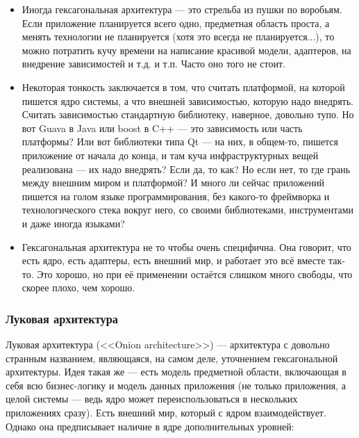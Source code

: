 \documentclass[a5paper]{article}
\begin{document}
\begin{itemize}
    \item Иногда гексагональная архитектура --- это стрельба из пушки по воробьям. Если приложение планируется всего одно, предметная область проста, а менять технологии не планируется (хотя это всегда не планируется...), то можно потратить кучу времени на написание красивой модели, адаптеров, на внедрение зависимостей и т.д. и т.п. Часто оно того не стоит.
    \item Некоторая тонкость заключается в том, что считать платформой, на которой пишется ядро системы, а что внешней зависимостью, которую надо внедрять. Считать зависимостью стандартную библиотеку, наверное, довольно тупо. Но вот Guava в Java или boost в C++ --- это зависимость или часть платформы? Или вот библиотеки типа Qt --- на них, в общем-то, пишется приложение от начала до конца, и там куча инфраструктурных вещей реализована --- их надо внедрять? Если да, то как? Но если нет, то где грань между внешним миром и платформой? И много ли сейчас приложений пишется на голом языке программирования, без какого-то фреймворка и технологического стека вокруг него, со своими библиотеками, инструментами и даже иногда языками?
    \item Гексагональная архитектура не то чтобы очень специфична. Она говорит, что есть ядро, есть адаптеры, есть внешний мир, и работает это всё вместе так-то. Это хорошо, но при её применении остаётся слишком много свободы, что скорее плохо, чем хорошо.
\end{itemize}

\subsubsection{Луковая архитектура}

Луковая архитектура (<<Onion architecture>>) --- архитектура с довольно странным названием, являющаяся, на самом деле, уточнением гексагональной архитектуры. Идея такая же --- есть модель предметной области, включающая в себя всю бизнес-логику и модель данных приложения (не только приложения, а целой системы --- ведь ядро может переиспользоваться в нескольких приложениях сразу). Есть внешний мир, который с ядром взаимодействует. Однако она предписывает наличие в ядре дополнительных уровней:
\end{document}
